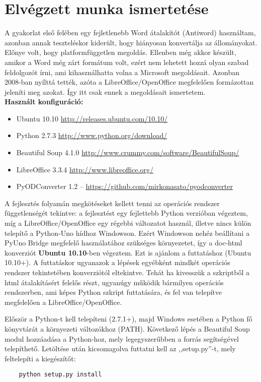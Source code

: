 \documentclass[a4paper,oneside,12pt]{article}
\begin{document}
\section{Elvégzett munka ismertetése}
A gyakorlat első felében egy fejletlenebb Word átalakítót (Antiword) használtam, azonban annak teszteléskor kiderült, hogy hiányosan konvertálja az állományokat. Előnye volt, hogy platformfüggetlen megoldás. Ellenben még akkor készült, amikor a Word még zárt formátum volt, ezért nem lehetett hozzá olyan szabad feldolgozót írni, ami kihasználhatta volna a Microsoft megoldásait. Azonban 2008-ban nyílttá tették, azóta a LibreOffice/OpenOffice megfelelően formázottan jeleníti meg azokat. Így itt csak ennek a megoldásait ismertetem.\\
\textbf{Használt konfiguráció:}
	\begin{itemize}
		\item Ubuntu 10.10 \href{http://releases.ubuntu.com/10.10/}{http://releases.ubuntu.com/10.10/}
		\item Python 2.7.3 \href{http://www.python.org/download/}{http://www.python.org/download/}
		\item Beautiful Soup 4.1.0 \href{http://www.crummy.com/software/BeautifulSoup/}{http://www.crummy.com/software/BeautifulSoup/}
		\item LibreOffice 3.3.4 \href{http://www.libreoffice.org/}{http://www.libreoffice.org/}
		\item PyODConverter 1.2  -- \href{https://github.com/mirkonasato/pyodconverter}{https://github.com/mirkonasato/pyodconverter}
	\end{itemize}
				
	A fejlesztés folyamán megkötéseket kellett tenni az operációs rendszer függetlenségét tekintve: a fejlesztést egy fejlettebb Python verzióban végeztem, míg a LibreOffice/OpenOffice egy régebbi változatot használ, illetve nincs külön telepítő a Python-Uno hídhoz Windowson. Ezért Windowson nehéz beállítani a PyUno Bridge megfelelő használatához szükséges környezetet, így a doc-html konverziót \textbf{Ubuntu 10.10}-ben végeztem. Ezt is ajánlom a futtatáshoz (Ubuntu 10.10+). A futtatáskor ugyanazok a lépések egyébként mindkét operációs rendszer tekintetében konverziótól eltekintve. Tehát ha kivesszük a szkriptből a html átalakításért felelős részt, ugyanúgy működik bármilyen operációs rendszerben, ami képes Python szkript futtatására, és fel van telepítve megfelelően a LibreOffice/OpenOffice.
	
	Először a Python-t kell telepíteni (2.7.1+), majd Windows esetében a Python fő könyvtárát a környezeti változókhoz (PATH). Következő lépés a Beautiful Soup modul hozzáadása a Python-hoz, mely legegyszerűbben a forrás segítségével telepíthető. Letöltése után kicsomagolva futtatni kell az ,,setup.py''-t, mely feltelepíti a kiegészítőt:
\begin{verbatim}
	python setup.py install
\end{verbatim}
\end{document}
